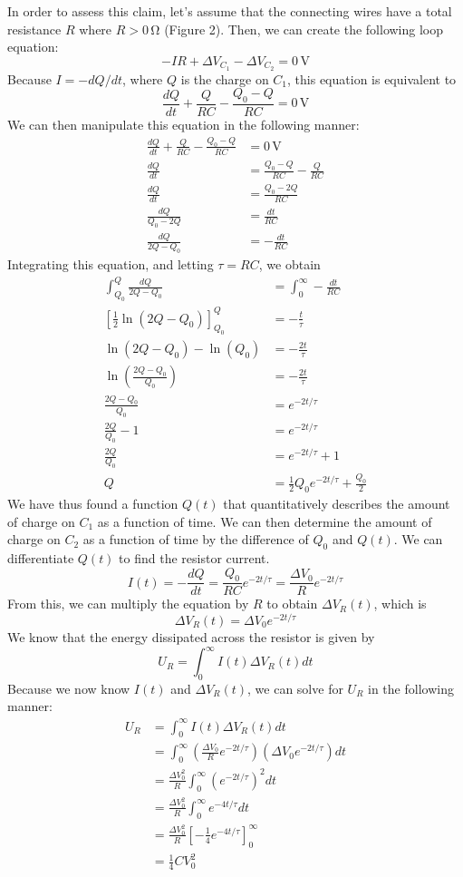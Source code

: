\documentclass{article}
\newcommand{\unit}[1]{\ensuremath{\, \mathrm{#1}}}
\begin{document}
In order to assess this claim, let's assume that the connecting wires have a total resistance $R$ where $R > 0 \unit{\Omega}$ (Figure 2).  Then, we can create the following loop equation:
\[
-IR + \Delta V_{C_1} - \Delta V_{C_2} = 0 \unit{V}
\]
Because $I = -dQ/dt$, where $Q$ is the charge on $C_1$, this equation is equivalent to
\[
\frac{dQ}{dt} + \frac{Q}{RC} - \frac{Q_0 - Q}{RC} = 0 \unit{V}
\]
We can then manipulate this equation in the following manner:
\begin{align*}
\frac{dQ}{dt} + \frac{Q}{RC} - \frac{Q_0 - Q}{RC} &= 0 \unit{V}\\
\frac{dQ}{dt} &= \frac{Q_0 - Q}{RC} - \frac{Q}{RC} \\
\frac{dQ}{dt} &= \frac{Q_0 - 2Q}{RC} \\
\frac{dQ}{Q_0 - 2Q} &= \frac{dt}{RC} \\
\frac{dQ}{2Q - Q_0} &= -\frac{dt}{RC}
\end{align*}
Integrating this equation, and letting $\tau = RC$, we obtain
\begin{align*}
\int_{Q_0}^Q \frac{dQ}{2Q - Q_0} &= \int_0^\infty -\frac{dt}{RC} \\
\left[ \frac{1}{2} \ln (2Q - Q_0) \right]_{Q_0}^Q &= - \frac{t}{\tau} \\
\ln(2Q - Q_0) - \ln(Q_0) &= -\frac{2t}{\tau} \\
\ln\left(\frac{2Q - Q_0}{Q_0}\right) &= -\frac{2t}{\tau} \\
\frac{2Q - Q_0}{Q_0} &= e^{-2t/ \tau}\\
\frac{2Q}{Q_0} - 1 &= e^{-2t/ \tau}\\
\frac{2Q}{Q_0} &= e^{-2t/ \tau} + 1\\
Q &= \frac{1}{2} Q_0 e^{-2t/ \tau} + \frac{Q_0}{2}
\end{align*}
We have thus found a function $Q(t)$ that quantitatively describes the amount of charge on $C_1$ as a function of time.  We can then determine the amount of charge on $C_2$ as a function of time by the difference of $Q_0$ and $Q(t)$.  We can differentiate $Q(t)$ to find the resistor current.
\[
I(t) = -\frac{dQ}{dt} = \frac{Q_0}{RC} e^{-2t/ \tau} = \frac{\Delta V_0}{R} e^{-2t/ \tau}
\]
From this, we can multiply the equation by $R$ to obtain $\Delta V_R(t)$, which is
\[
\Delta V_R(t) = \Delta V_0 e^{-2t/\tau}
\]
We know that the energy dissipated across the resistor is given by
\[
U_R = \int_0^\infty I(t) \Delta V_R(t) dt
\]
Because we now know $I(t)$ and $\Delta V_R(t)$, we can solve for $U_R$ in the following manner:
\begin{align*}
U_R &= \int_0^\infty I(t) \Delta V_R(t) dt \\
&= \int_0^\infty \left( \frac{\Delta V_0}{R} e^{-2t/ \tau} \right) \left( \Delta V_0 e^{-2t/\tau} \right) dt \\
&= \frac{\Delta V_0^2}{R} \int_0^\infty \left( e^{-2t/ \tau} \right)^2 dt \\
&= \frac{\Delta V_0^2}{R} \int_0^\infty e^{-4t/ \tau} dt \\
&= \frac{\Delta V_0^2}{R} \left[ -\frac{1}{4}e^{-4t / \tau} \right]_0^\infty \\
&= \frac{1}{4} CV_0^2
\end{align*}
\end{document}
